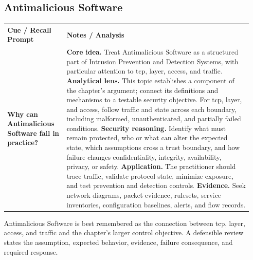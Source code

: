 \documentclass[11pt]{article}
\newcommand{\CornellHeader}{%
\rowcolor{Navy}\color{white}\bfseries Cue / Recall Prompt & \color{white}\bfseries Notes / Analysis\\\hline}
\newcommand{\CornellRow}[2]{%
\cellcolor{CueGray}\RaggedRight\textbf{#1} & \RaggedRight #2\\\hline}
\begin{document}
\subsection*{Antimalicious Software}
\begin{longtable}{>{\RaggedRight\arraybackslash}p{}|>{\RaggedRight\arraybackslash}p{}}
\CornellHeader
\CornellRow{Why can Antimalicious Software fail in practice?}{\textbf{Core idea.} Treat Antimalicious Software as a structured part of Intrusion Prevention and Detection Systems, with particular attention to tcp, layer, access, and traffic. \textbf{Analytical lens.} This topic establishes a component of the chapter's argument; connect its definitions and mechanisms to a testable security objective. For tcp, layer, and access, follow traffic and state across each boundary, including malformed, unauthenticated, and partially failed conditions. \textbf{Security reasoning.} Identify what must remain protected, who or what can alter the expected state, which assumptions cross a trust boundary, and how failure changes confidentiality, integrity, availability, privacy, or safety. \textbf{Application.} The practitioner should trace traffic, validate protocol state, minimize exposure, and test prevention and detection controls. \textbf{Evidence.} Seek network diagrams, packet evidence, rulesets, service inventories, configuration baselines, alerts, and flow records.}
\end{longtable}
\begin{topicsummary}
Antimalicious Software is best remembered as the connection between tcp, layer, access, and traffic and the chapter's larger control objective. A defensible review states the assumption, expected behavior, evidence, failure consequence, and required response.
\end{topicsummary}
\end{document}
